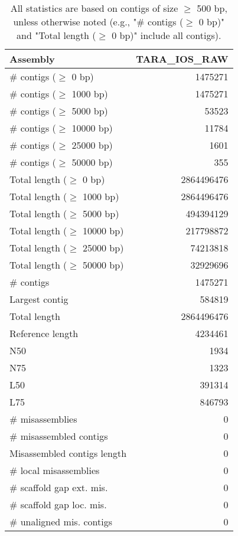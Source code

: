 \documentclass[12pt,a4paper]{article}
\begin{document}
\begin{table}[ht]
\begin{center}
\caption{All statistics are based on contigs of size $\geq$ 500 bp, unless otherwise noted (e.g., "\# contigs ($\geq$ 0 bp)" and "Total length ($\geq$ 0 bp)" include all contigs).}
\begin{tabular}{|l*{1}{|r}|}
\hline
Assembly & TARA\_IOS\_RAW \\ \hline
\# contigs ($\geq$ 0 bp) & 1475271 \\ \hline
\# contigs ($\geq$ 1000 bp) & 1475271 \\ \hline
\# contigs ($\geq$ 5000 bp) & 53523 \\ \hline
\# contigs ($\geq$ 10000 bp) & 11784 \\ \hline
\# contigs ($\geq$ 25000 bp) & 1601 \\ \hline
\# contigs ($\geq$ 50000 bp) & 355 \\ \hline
Total length ($\geq$ 0 bp) & 2864496476 \\ \hline
Total length ($\geq$ 1000 bp) & 2864496476 \\ \hline
Total length ($\geq$ 5000 bp) & 494394129 \\ \hline
Total length ($\geq$ 10000 bp) & 217798872 \\ \hline
Total length ($\geq$ 25000 bp) & 74213818 \\ \hline
Total length ($\geq$ 50000 bp) & 32929696 \\ \hline
\# contigs & 1475271 \\ \hline
Largest contig & 584819 \\ \hline
Total length & 2864496476 \\ \hline
Reference length & 4234461 \\ \hline
N50 & 1934 \\ \hline
N75 & 1323 \\ \hline
L50 & 391314 \\ \hline
L75 & 846793 \\ \hline
\# misassemblies & 0 \\ \hline
\# misassembled contigs & 0 \\ \hline
Misassembled contigs length & 0 \\ \hline
\# local misassemblies & 0 \\ \hline
\# scaffold gap ext. mis. & 0 \\ \hline
\# scaffold gap loc. mis. & 0 \\ \hline
\# unaligned mis. contigs & 0 \\ \hline

\end{tabular}
\end{center}
\end{table}
\end{document}
